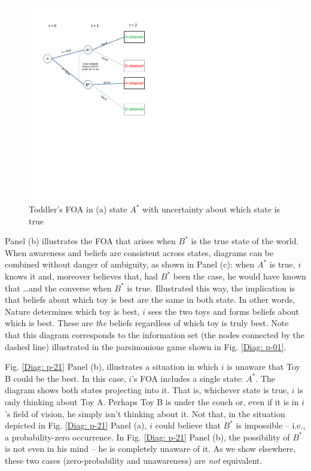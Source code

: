 \documentclass[
11pt,
titlepage,
reqno,
]{article}%
\theoremstyle{definition}
\begin{document}
\begin{figure}[h!]
	\centering
	\includegraphics*[page=21,trim = 0in 4.5in 0in .5in,scale=.7]{Awareness_Diagrams_All}
	\caption{Toddler's FOA in (a) state $A^\ast$ with uncertainty about which state is true\label{Diag: p-21XX}}%
\end{figure}

Panel (b) illustrates the FOA that arises when $B^\ast$ is the true state of the world. When awareness and beliefs are consistent across states, diagrams can be combined without danger of ambiguity, as shown in Panel (c): when $A^\ast$ is true, $i$ knows it and, moreover believes that, had $B^\ast$ been the case, he would have known that \ldots and the converse when $B^\ast$ is true. Illustrated this way, the implication is that beliefs about which toy is best are the same in both state. In other words, Nature determines which toy is best, $i$ sees the two toys and forms beliefs about which is best. These are \textit{the} beliefs regardless of which toy is truly best. Note that this diagram corresponds to the information set (the nodes connected by the dashed line) illustrated in the parsimonious game shown in Fig. \ref{Diag: p-01}. 

Fig. \ref{Diag: p-21} Panel (b), illustrates a situation in which $i$ is unaware that Toy B could be the best. In this case, $i$'s FOA includes a single state: $A^\ast$. The diagram shows both states projecting into it. That is, whichever state is true, $i$ is only thinking about Toy A. Perhaps Toy B is under the couch or, even if it is in $i$'s field of vision, he simply isn't thinking about it. Not that, in the situation depicted in Fig. \ref{Diag: p-21} Panel (a), $i$ could believe that $B^\ast$ is impossible -- i.e., a probability-zero occurrence. In Fig. \ref{Diag: p-21} Panel (b), the possibility of $B^\ast$ is not even in his mind -- he is completely unaware of it. As we show elsewhere, these two cases (zero-probability and unawareness) are \textit{not} equivalent. 
\end{document}
